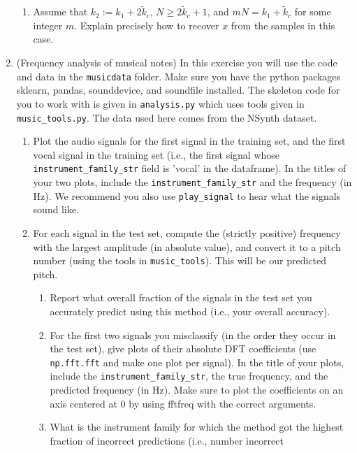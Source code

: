 \documentclass[12pt,twoside]{article}
\begin{document}
\begin{enumerate}
\begin{enumerate}
\item Assume that $k_2:=k_1 + 2\tilde{k}_c$, $N\geq 2\tilde{k}_c+1$,
  and $mN = k_1+\tilde{k}_c$ for some integer $m$. Explain precisely how to recover $x$ from the samples in this case.
\end{enumerate} 
 
 \newpage
 \item  (Frequency analysis of musical notes) In this exercise you will
  use the code and data in the \texttt{musicdata} folder.  Make sure you have
  the python packages sklearn, pandas, sounddevice, and soundfile
  installed.  The skeleton code for you to work with is given in
  \texttt{analysis.py} which uses tools given in
  \texttt{music\_tools.py}.  The data used here comes from the NSynth
  dataset.

  \begin{enumerate}
  \item Plot the audio signals for the first signal in the training
    set, and the first vocal signal in the training set (i.e., the
    first signal whose \texttt{instrument\_family\_str} field is
    'vocal' in the dataframe).  In the titles of your two plots, include the
    \texttt{instrument\_family\_str} and the frequency (in Hz).
    We recommend you also use \texttt{play\_signal}
    to hear what the signals sound like.
  \item For each signal in the test set, compute the (strictly positive)
    frequency with the largest amplitude (in absolute value), and
    convert it to a pitch number (using the tools in
    \texttt{music\_tools}).  This will be our predicted pitch.
    \begin{enumerate}
    \item Report what overall fraction of the signals in
      the test set you accurately predict using this method (i.e.,
      your overall accuracy).
    \item For the
      first two signals you misclassify (in the order they occur in the
      test set), give plots of their absolute
      DFT coefficients (use \texttt{np.fft.fft} and make one plot per
      signal). In the title of your plots, include the
      \texttt{instrument\_family\_str}, the true frequency, and the
      predicted frequency (in Hz).  Make
      sure to plot the coefficients on an axis centered at $0$ by using
      fftfreq with the correct arguments.
    \item What is the instrument family for which the method got the
      highest fraction of incorrect predictions (i.e., number incorrect

\end{enumerate}
\end{enumerate}
\end{enumerate}
\end{document}
